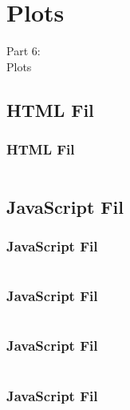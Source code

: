 \section{Plots}
\begin{frame}
    \vspace{25mm}
    \begin{center}
        \Huge{Part 6:\\Plots}
    \end{center}
\end{frame}

\subsection{HTML Fil}
\begin{frame}
    \frametitle{HTML Fil}
    \vspace{-1mm}
    \inputminted[fontsize=\footnotesize,breaklines=true,highlightlines={10,13}]{html}{../src/frontend/part6_plot/index.html}
\end{frame}

\subsection{JavaScript Fil}
\begin{frame}
    \frametitle{JavaScript Fil}
    \vspace{-2mm}
    \begin{multicols}{2}
      \inputminted[fontsize=\tiny,highlightlines={}]{javascript}{../src/frontend/part6_plot/logic.js}
    \end{multicols}
\end{frame}
\begin{frame}
    \frametitle{JavaScript Fil}
    \vspace{-2mm}
    \begin{multicols}{2}
      \inputminted[fontsize=\tiny,highlightlines={1-3,38-39,43-44}]{javascript}{../src/frontend/part6_plot/logic.js}
    \end{multicols}
\end{frame}
\begin{frame}
    \frametitle{JavaScript Fil}
    \vspace{-2mm}
    \begin{multicols}{2}
      \inputminted[fontsize=\tiny,highlightlines={41}]{javascript}{../src/frontend/part6_plot/logic.js}
    \end{multicols}
\end{frame}
\begin{frame}
    \frametitle{JavaScript Fil}
    \vspace{-2mm}
    \begin{multicols}{2}
      \inputminted[fontsize=\tiny,highlightlines={42-45}]{javascript}{../src/frontend/part6_plot/logic.js}
    \end{multicols}
\end{frame}

